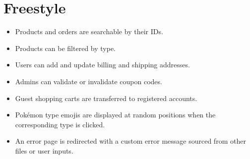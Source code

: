 \section{Freestyle}

\begin{itemize}
    \item Products and orders are searchable by their IDs.
    \item Products can be filtered by type.
    \item Users can add and update billing and shipping addresses.
    \item Admins can validate or invalidate coupon codes.
    \item Guest shopping carts are transferred to registered accounts.
    \item Pokémon type emojis are displayed at random positions when the corresponding type is clicked.
    \item An error page is redirected with a custom error message sourced from other files or user inputs.
\end{itemize}
